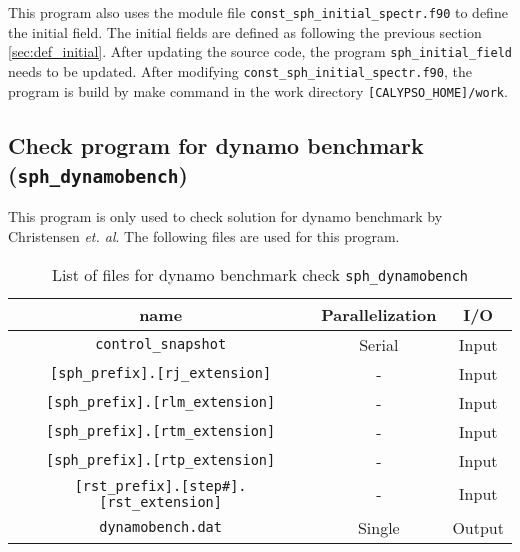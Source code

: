 This program also uses the module file \verb|const_sph_initial_spectr.f90| to define the initial field. The initial fields are defined as following the previous section \ref{sec:def_initial}. After updating the source code, the program \verb|sph_initial_field| needs to be updated. After modifying  \verb|const_sph_initial_spectr.f90|, the program is build by make command in  the work directory \verb|[CALYPSO_HOME]/work|.

\subsection{Check program for dynamo benchmark \\
({\tt sph\_dynamobench})}
\label{section:check_bench}
This program is only used to check solution for dynamo benchmark by Christensen {\it et. al}. The following files are used for this program.

\begin{table}[htp]
\caption{List of files for dynamo benchmark check {\tt sph\_dynamobench} }
\begin{center} 
\begin{tabular}{|c|c|c|}
\hline
 name & Parallelization & I/O \\ \hline \hline
\verb|control_snapshot| & Serial & Input \\ \hline
\verb|[sph_prefix].[rj_extension]|  & - & Input \\
\verb|[sph_prefix].[rlm_extension]| & - & Input \\
\verb|[sph_prefix].[rtm_extension]| & - & Input \\
\verb|[sph_prefix].[rtp_extension]| & - & Input \\ \hline
\verb|[rst_prefix].[step#].[rst_extension]| &  - & Input  \\ \hline
\verb|dynamobench.dat| & Single & Output \\ \hline
\end{tabular}
\end{center}
\label{table:sph_dynamobench}
\end{table}

